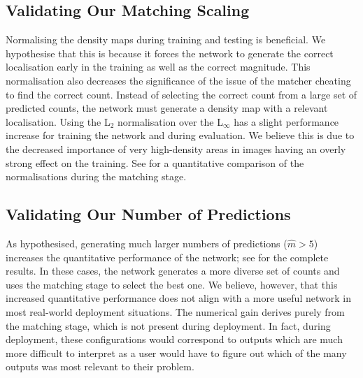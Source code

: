 \documentclass[../thesis.tex]{subfiles}
\begin{document}
\subsection{Validating Our Matching Scaling}\label{sec__ABC123__ablation_matchers}
Normalising the density maps during training and testing is beneficial. 
We hypothesise that this is because it forces the network to generate the correct localisation early in the training as well as the correct magnitude. 
This normalisation also decreases the significance of the issue of the matcher cheating to find the correct count.
Instead of selecting the correct count from a large set of predicted counts, the network must generate a density map with a relevant localisation.
Using the L$_2$ normalisation over the L$_\infty$ has a slight performance increase for training the network and during evaluation. 
We believe this is due to the decreased importance of very high-density areas in images having an overly strong effect on the training.
See  for a quantitative comparison of the normalisations during the matching stage.
\begin{table}
    \centering
   \resizebox{\textwidth}{!}{%
   
   }
    \caption{Effect of using normalised density maps for the matching stage. Normalisation improves the accuracy of ABC123. $L_2$ normalisation is more effective than $L_\infty$ during training and evaluation.
    }
    \label{table__ABC123__ablation_normalised_matching}
\end{table}

\subsection{Validating Our Number of Predictions}\label{sec__ABC123__ablation_mhat}

As hypothesised, generating much larger numbers of predictions ($\hat{m} > 5$) increases the quantitative performance of the network; see  for the complete results. In these cases, the network generates a more diverse set of counts and uses the matching stage to select the best one. 
We believe, however, that this increased quantitative performance does not align with a more useful network in most real-world deployment situations. 
The numerical gain derives purely from the matching stage, which is not present during deployment. 
In fact, during deployment, these configurations would correspond to outputs which are much more difficult to interpret as a user would have to figure out which of the many outputs was most relevant to their problem.
\end{document}
